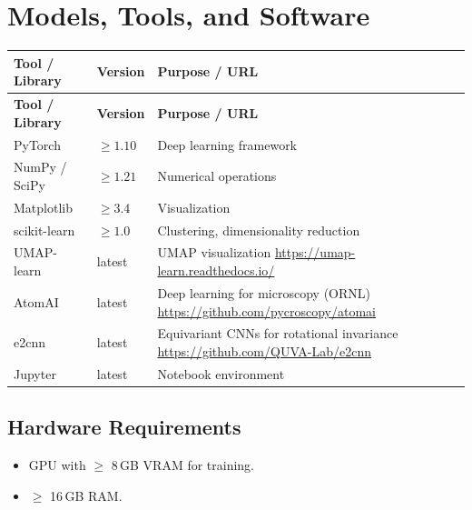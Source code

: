 \documentclass[11pt,a4paper]{article}
\begin{document}
\section{Models, Tools, and Software}

\begin{longtable}{p{4.5cm} p{2.5cm} p{6.5cm}}
\toprule
\textbf{Tool / Library} & \textbf{Version} & \textbf{Purpose / URL} \\
\midrule
\endfirsthead
\toprule
\textbf{Tool / Library} & \textbf{Version} & \textbf{Purpose / URL} \\
\midrule
\endhead
PyTorch & $\geq 1.10$ & Deep learning framework \\
\midrule
NumPy / SciPy & $\geq 1.21$ & Numerical operations \\
\midrule
Matplotlib & $\geq 3.4$ & Visualization \\
\midrule
scikit-learn & $\geq 1.0$ & Clustering, dimensionality reduction \\
\midrule
UMAP-learn & latest & UMAP visualization \newline \url{https://umap-learn.readthedocs.io/} \\
\midrule
AtomAI & latest & Deep learning for microscopy (ORNL) \newline \url{https://github.com/pycroscopy/atomai} \\
\midrule
e2cnn & latest & Equivariant CNNs for rotational invariance \newline \url{https://github.com/QUVA-Lab/e2cnn} \\
\midrule
Jupyter & latest & Notebook environment \\
\bottomrule
\end{longtable}

\subsection{Hardware Requirements}
\begin{itemize}
  \item GPU with $\geq$ 8\,GB VRAM for training.
  \item $\geq$ 16\,GB RAM.
\end{itemize}
\end{document}
